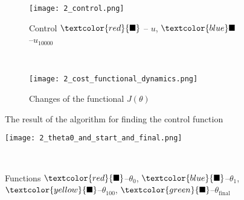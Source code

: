 \documentclass[9pt]{beamer}
\begin{document}
\begin{frame}
    \begin{figure}
        \begin{subfigure}[b]{0.5\textwidth}
        \texttt{[image: 2\_control.png]}
        \caption{Control $\textcolor{red}{\blacksquare}$ -- $u$, $\textcolor{blue}\blacksquare$ --$u_{10000}$}
        \end{subfigure}%
        ~ %
        \begin{subfigure}[b]{0.5\textwidth}
        \texttt{[image: 2\_cost\_functional\_dynamics.png]}
        \caption{Changes of the functional  $J(\theta)$}
        \end{subfigure}
        \caption{The result of the algorithm for finding the control function}
    \end{figure}

\end{frame}
\begin{frame}
        \begin{figure}[H]
            \texttt{[image: 2\_theta0\_and\_start\_and\_final.png]}
            \caption{Functions $\textcolor{red}{\blacksquare}$--$\theta_0$,  $\textcolor{blue}{\blacksquare}$--$\theta_1$, $\textcolor{yellow}{\blacksquare}$--$\theta_{100}$,  $\textcolor{green}{\blacksquare}$--$\theta_\text{final}$ }
            ~ %
        \end{figure}
\end{frame}

\begin{frame}
\end{frame}
\end{document}
